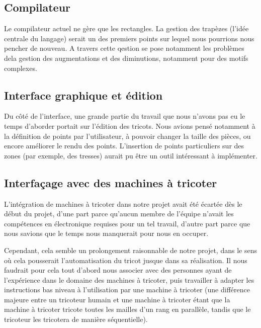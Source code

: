 \documentclass{article}
\begin{document}

\subsection{Compilateur}

Le compilateur actuel ne gère que les rectangles. La gestion des trapèzes 
(l'idée centrale du langage) serait un des premiers points sur lequel nous
pourrions nous pencher de nouveau. A travers cette qestion se pose notamment
les problèmes dela gestion des augmentations et des diminutions, notamment pour
des motifs complexes.

\subsection{Interface graphique et édition}

Du côté de l'interface, une grande partie du travail que nous n'avons
pas eu le temps d'aborder portait sur l'édition des tricots. Nous
avions pensé notamment à la définition de points par l'utilisateur, à
pouvoir changer la taille des pièces, ou encore améliorer le rendu des
points. L'insertion de points particuliers sur des zones (par exemple,
des tresses) aurait pu être un outil intéressant à implémenter.

\subsection{Interfaçage avec des machines à tricoter}

L'intégration de machines à tricoter dans notre projet avait été écartée dès le 
début du projet, d'une part parce qu'aucun membre de l'équipe n'avait les compétences 
en électronique requises pour un tel travail, d'autre part parce que nous savions que 
le temps nous manquerait pour nous en occuper.

Cependant, cela semble un prolongement raisonnable de notre projet, dans le sens où 
cela pousserait l'automatisation du tricot jusque dans sa réalisation. Il nous faudrait 
pour cela tout d'abord nous associer avec des personnes ayant de l'expérience dans le 
domaine des machines à tricoter, puis travailler à adapter les instructions bas niveau 
à l'utilisation par une machine à tricoter (une différence majeure entre un tricoteur 
humain et une machine à tricoter étant que la machine à tricoter tricote toutes les 
mailles d'un rang en parallèle, tandis que le tricoteur les tricotera de manière séquentielle).
\end{document}
